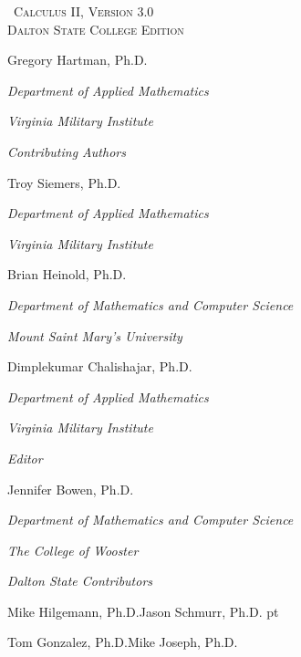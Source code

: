 
\hskip 125pt\begin{minipage}{\textwidth}
\begin{flushright}

\textsc{\large \apex\ {\Huge Calculus II}, {\small Version 3.0}} \\

\textsc{Dalton State College Edition}\\
{
\Large
\vspace{0.25in}

Gregory Hartman, Ph.D.

\emph{\small Department of Applied Mathematics}

\emph{\small Virginia Military Institute}\vskip15pt

\parbox{200pt}{\textit{Contributing Authors}}\hskip 2cm \phantom{.}

Troy Siemers, Ph.D.

\emph{\small Department of Applied Mathematics}

\emph{\small Virginia Military Institute}\vskip 15pt

Brian Heinold, Ph.D.

\emph{\small Department of Mathematics and Computer Science}

\emph{\small Mount Saint Mary's University}\vskip 15pt

Dimplekumar Chalishajar, Ph.D.

\emph{\small Department of Applied Mathematics}

\emph{\small Virginia Military Institute}\vskip 15pt

\parbox{200pt}{\textit{Editor}}\hskip 2cm \phantom{.}

Jennifer Bowen, Ph.D.

\emph{\small Department of Mathematics and Computer Science}

\emph{\small The College of Wooster} \vskip 15pt

\parbox{200pt}{\textit{Dalton State Contributors}}\hskip 2cm \phantom{.}

\large\vskip 4pt

Mike Hilgemann, Ph.D.\qquad Jason Schmurr, Ph.D. pt

Tom Gonzalez, Ph.D.\phantom{D.}\qquad Mike Joseph, Ph.D.}
\normalsize
\end{flushright}
\end{minipage}

